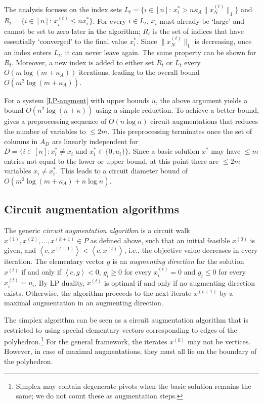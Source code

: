 \documentclass[11pt, a4paper]{article}
\newcommand{\pr}[2]{\left\langle #1, #2 \right\rangle}
\newcommand{\1}{\mathbbm{1}}
\theoremstyle{case}
\begin{document}
The analysis focuses on the index sets $L_t=\{i\in [n]:\, x^*_i>n\kappa_A\|x^{(t)}_N\|_1\}$ and $R_t=\{i\in [n]:\, x^{(t)}_i\le nx^*_i\}$. For every $i\in L_t$, $x_i$ must already be `large' and cannot be set to zero later in the algorithm; $R_t$ is the set of indices that have essentially `converged' to the final value $x^*_i$. Since $\|x^{(t)}_N\|_1$ is decreasing, once an index enters $L_t$, it can never leave again. The same property can be shown for $R_t$. Moreover, a new index is added to either set $R_t$ or $L_t$ every $O(m\log(m+\kappa_A))$ iterations, leading to the
 overall bound $O(m^2 \log(m + \kappa_A))$. 

For a system \ref{LP-augment} with upper bounds $u$, the above argument yields a bound $O(n^2\log(n + \kappa))$ using a simple reduction. To achieve a better bound, \cite{dadush2021circuit} gives a preprocessing sequence of $O(n \log n)$  circuit augmentations that reduces the number of variables to $\le 2m$.
This preprocessing terminates once the set of columns in $A_D$ are linearly independent for $D=\{i \in [n] : x_i^* \neq x_i \text{ and } x_i^* \in \{0, u_i\} \}$. Since a basic solution $x^*$ may have $\le m$ entries not equal to the lower or upper bound, at this point there are $\le 2m$ variables $x_i\neq x_i^*$. This leads to a circuit diameter bound of $O(m^2 \log(m + \kappa_A) + n \log n)$.

\subsection{Circuit augmentation algorithms}

\label{subsec:circ-diameter-algorithms}
The generic \emph{circuit augmentation algorithm} is a circuit walk  $x^{(1)},x^{(2)},\ldots,x^{(k+1)}\in P$ as defined above, such that an initial  feasible $x^{(0)}$ is given, 
and $\pr{c}{x^{(t+1)}}<\pr{c}{x^{(t)}}$, i.e., the objective value decreases in every iteration.
The elementary vector $g$ is an \emph{augmenting direction} for the solution $x^{(t)}$
 if and only if $\pr{c}{g}<0$, $g_i\ge 0$ for every $x^{(t)}_i=0$ and $g_i\le 0$ for every  $x^{(t)}_i=u_i$. By LP duality, $x^{(t)}$ is optimal if and only if no augmenting direction exists. Otherwise, the algorithm proceeds to the next iterate  $x^{(t+1)}$ by a maximal augmentation in an augmenting direction.

The simplex algorithm can be seen as a circuit augmentation algorithm that is restricted to using special elementary vectors corresponding to edges of the polyhedron.\footnote{Simplex may contain degenerate pivots when the basic solution remains the same; we do not count these as augmentation steps.} For the general framework, the iterates $x^{(k)}$ may not be vertices. However, in case of maximal augmentations, they must all lie on the boundary of the polyhedron.
\end{document}
